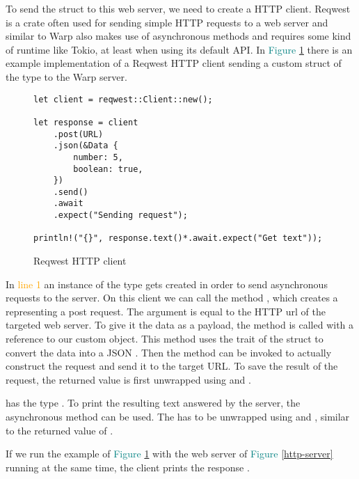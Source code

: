 To send the struct to this web server, we need to create a HTTP client. Reqwest is a crate often used for sending
simple HTTP requests to a web server and similar to Warp also makes use of asynchronous methods and requires some kind
of runtime like Tokio, at least when using its default API. In \textcolor{teal}{Figure \ref{http-client}} there is an
example implementation of a Reqwest HTTP client sending a custom struct of the type  to the Warp server.

\begin{figure}[ht]
    \begin{verbatim}
let client = reqwest::Client::new();

let response = client
    .post(URL)
    .json(&Data {
        number: 5,
        boolean: true,
    })
    .send()
    .await
    .expect("Sending request");

println!("{}", response.text()*.await.expect("Get text"));
    \end{verbatim}
    \caption{Reqwest HTTP client}
    \label{http-client}
\end{figure}

In \textcolor{orange}{line 1} an instance of the type  gets created in order to send asynchronous
requests to the server. On this client we can call the method , which creates a
 representing a post request. The argument  is equal to the HTTP url of the
targeted web server. To give it the data as a payload, the method  is called with a reference to our custom
 object. This method uses the  trait of the struct to convert the data into a JSON
. Then the  method can be invoked to actually construct the request and send it to the target
URL. To save the result of the request, the returned value is first unwrapped using  and .

 has the type . To print the resulting text answered by the server, the
asynchronous method  can be used. The  has to be unwrapped using  and
, similar to the returned value of .

If we run the example of \textcolor{teal}{Figure \ref{http-client}} with the web server of
\textcolor{teal}{Figure \ref{http-server}} running at the same time, the client prints the response
 .
